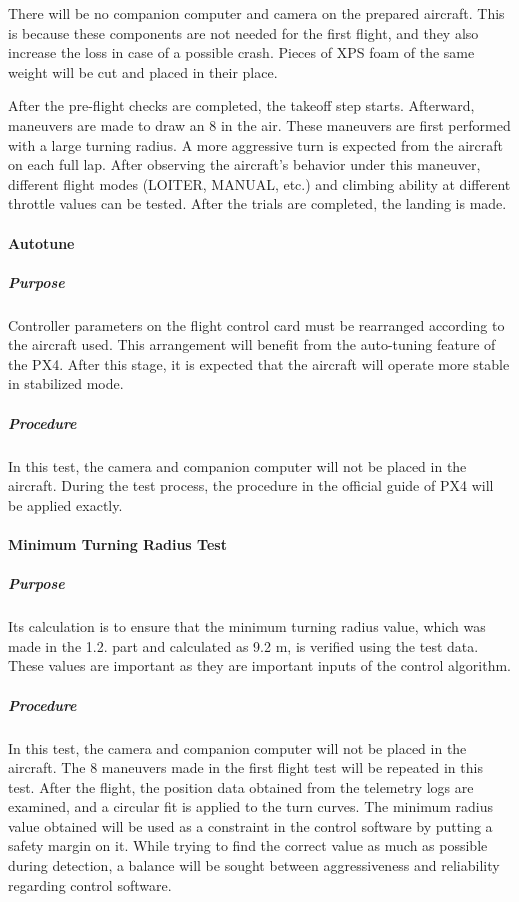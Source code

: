 \documentclass[12pt]{article}
\begin{document}
There will be no companion computer and camera on the prepared aircraft. This is because these components are not needed for the first flight, and they also increase the loss in case of a possible crash. Pieces of XPS foam of the same weight will be cut and placed in their place.

After the pre-flight checks are completed, the takeoff step starts. Afterward, maneuvers are made to draw an 8 in the air. These maneuvers are first performed with a large turning radius. A more aggressive turn is expected from the aircraft on each full lap. After observing the aircraft's behavior under this maneuver, different flight modes (LOITER, MANUAL, etc.) and climbing ability at different throttle values can be tested. After the trials are completed, the landing is made.

\paragraph*{Autotune} 
\subparagraph*{Purpose} Controller parameters on the flight control card must be rearranged according to the aircraft used. This arrangement will benefit from the auto-tuning feature of the PX4. After this stage, it is expected that the aircraft will operate more stable in stabilized mode.

\subparagraph*{Procedure}In this test, the camera and companion computer will not be placed in the aircraft. During the test process, the procedure in the official guide of PX4 will be applied exactly.

\paragraph*{Minimum Turning Radius Test}

\subparagraph*{Purpose} Its calculation is to ensure that the minimum turning radius value, which was made in the 1.2. part and calculated as 9.2 m, is verified using the test data. These values are important as they are important inputs of the control algorithm.

\subparagraph*{Procedure} In this test, the camera and companion computer will not be placed in the aircraft. 
The 8 maneuvers made in the first flight test will be repeated in this test. After the flight, the position data obtained from the telemetry logs are examined, and a circular fit is applied to the turn curves. The minimum radius value obtained will be used as a constraint in the control software by putting a safety margin on it. While trying to find the correct value as much as possible during detection, a balance will be sought between aggressiveness and reliability regarding control software.
\end{document}

